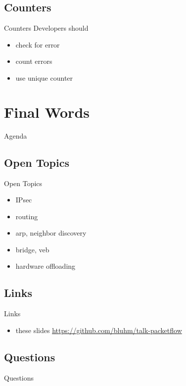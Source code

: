 \documentclass[14pt]{beamer}
\begin{document}
\subsection{Counters}
\begin{frame}{Counters}
Developers should
\begin{itemize}
  \item check for error
  \item count errors
  \item use unique counter
\end{itemize}
\end{frame}

\section{Final Words}
\begin{frame}{Agenda}
\tableofcontents[currentsection]
\end{frame}

\subsection{Open Topics}
\begin{frame}{Open Topics}
\begin{itemize}
  \item IPsec
  \item routing
  \item arp, neighbor discovery
  \item bridge, veb
  \item hardware offloading
\end{itemize}
\end{frame}

\subsection{Links}
\begin{frame}{Links}
\begin{itemize}
  \item these slides
    {\small \url{https://github.com/bluhm/talk-packetflow}}
\end{itemize}
\end{frame}

\subsection{Questions}
\begin{frame}{Questions}
\begin{center}
\end{center}
\end{frame}
\end{document}
